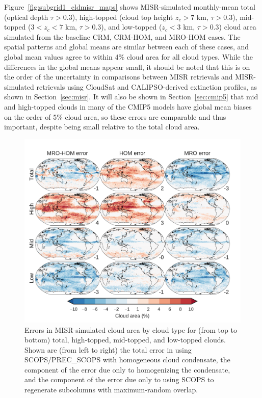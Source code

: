 Figure~\ref{fig:subgrid1_cldmisr_maps} shows MISR-simulated monthly-mean
total (optical depth \(\tau > 0.3\)), high-topped (cloud top height
\(z_c > 7\) km, \(\tau > 0.3\)), mid-topped (\(3 < z_c < 7\) km,
\(\tau > 0.3\)), and low-topped (\(z_c < 3\) km, \(\tau > 0.3\)) cloud
area simulated from the baseline CRM, CRM-HOM, and MRO-HOM cases. The
spatial patterns and global means are similar between each of these
cases, and global mean values agree to within 4\% cloud area for all
cloud types. While the differences in the global means appear small, it
should be noted that this is on the order of the uncertainty in
comparisons between MISR retrievals and MISR-simulated retrievals using
CloudSat and CALIPSO-derived extinction profiles, as shown in
Section~\ref{sec:misr}. It will also be shown in Section~\ref{sec:cmip5}
that mid and high-topped clouds in many of the CMIP5 models have global
mean biases on the order of 5\% cloud area, so these errors are
comparable and thus important, despite being small relative to the total
cloud area.

\begin{figure}[htbp]
\centering
\includegraphics{graphics/subgrid1_cldmisr_maps_diff.pdf}
\caption{\label{fig:subgrid1_cldmisr_maps_diff}Errors in MISR-simulated
cloud area by cloud type for (from top to bottom) total, high-topped,
mid-topped, and low-topped clouds. Shown are (from left to right) the
total error in using SCOPS/PREC\_SCOPS with homogeneous cloud
condensate, the component of the error due only to homogenizing the
condensate, and the component of the error due only to using SCOPS to
regenerate subcolumns with maximum-random
overlap.}\label{fig:subgrid1ux5fcldmisrux5fmapsux5fdiff}
\end{figure}

